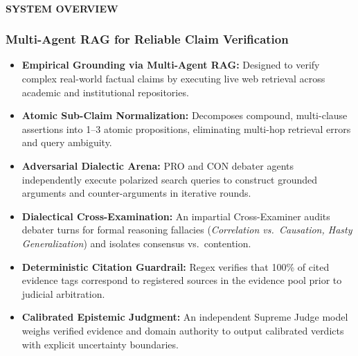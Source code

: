 \documentclass[aspectratio=169, 10pt]{beamer}
\begin{document}
\begin{frame}
    \framesubtitle{SYSTEM OVERVIEW}
    \frametitle{Multi-Agent RAG for Reliable Claim Verification}
    \vspace{-0.05cm}
    {\small
    \begin{itemize}\setlength\itemsep{0.08cm}
        \item \textbf{Empirical Grounding via Multi-Agent RAG:} Designed to verify complex real-world factual claims by executing live web retrieval across academic and institutional repositories.
        \item \textbf{Atomic Sub-Claim Normalization:} Decomposes compound, multi-clause assertions into 1--3 atomic propositions, eliminating multi-hop retrieval errors and query ambiguity.
        \item \textbf{Adversarial Dialectic Arena:} PRO and CON debater agents independently execute polarized search queries to construct grounded arguments and counter-arguments in iterative rounds.
        \item \textbf{Dialectical Cross-Examination:} An impartial Cross-Examiner audits debater turns for formal reasoning fallacies (\textit{Correlation vs.\ Causation, Hasty Generalization}) and isolates consensus vs.\ contention.
        \item \textbf{Deterministic Citation Guardrail:} Regex verifies that 100\% of cited evidence tags correspond to registered sources in the evidence pool prior to judicial arbitration.
        \item \textbf{Calibrated Epistemic Judgment:} An independent Supreme Judge model weighs verified evidence and domain authority to output calibrated verdicts with explicit uncertainty boundaries.
    \end{itemize}
    }
\end{frame}
\end{document}
